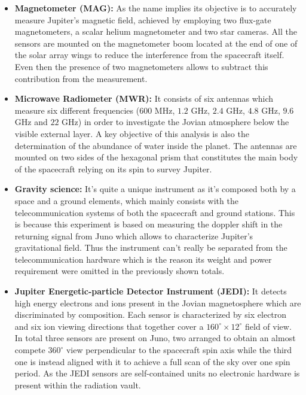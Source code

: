 \begin{itemize}
    \item \textbf{Magnetometer (MAG):} As the name implies its objective is to accurately measure Jupiter's magnetic field, achieved by employing two flux-gate magnetometers, a scalar helium magnetometer and two star cameras. All the sensors are mounted on the magnetometer boom located at the end of one of the solar array wings to reduce the interference from the spacecraft itself. Even then the presence of two magnetometers allows to subtract this contribution from the measurement.
    
    \item \textbf{Microwave Radiometer (MWR):} It consists of six antennas which measure six different frequencies ($600$ MHz, $1.2$ GHz, $2.4$ GHz, $4.8$ GHz, $9.6$ GHz and $22$ GHz) in order to investigate the Jovian atmosphere below the visible external layer. A key objective of this analysis is also the determination of the abundance of water inside the planet. The antennas are mounted on two sides of the hexagonal prism that constitutes the main body of the spacecraft relying on its spin to survey Jupiter.
    
    \item \textbf{Gravity science:} It's quite a unique instrument as it's composed both by a space and a ground elements, which mainly consists with the telecommunication systems of both the spacecraft and ground stations. This is because this experiment is based on measuring the doppler shift in the returning signal from Juno which allows to characterize Jupiter's gravitational field. Thus the instrument can't really be separated from the telecommunication hardware which is the reason its weight and power requirement were omitted in the previously shown totals.
    
    \item \textbf{Jupiter Energetic-particle Detector Instrument (JEDI):} It detects high energy electrons and ions present in the Jovian magnetosphere which are discriminated by composition. Each sensor is characterized by six electron and six ion viewing directions that together cover a $160^{\circ} \times 12^{\circ}$ field of view. In total three sensors are present on Juno, two arranged to obtain an almost compete $360^{\circ}$ view perpendicular to the spacecraft spin axis while the third one is instead aligned with it to achieve a full scan of the sky over one spin period. As the JEDI sensors are self-contained units no electronic hardware is present within the radiation vault.


\end{itemize}
